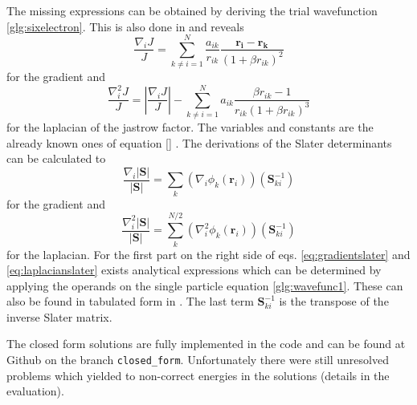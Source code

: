 The missing expressions can be obtained by deriving the trial wavefunction \ref{glg:sixelectron}. This is also done in \citet{hogberget2013} and reveals 
\begin{equation}\label{eq:jastrow-derivations}
    \frac{\nabla_i J}{J} = \sum_{k\neq i = 1}^{N}\frac{a_{ik}}{r_{ik}} \frac{\mathbf{r_i}-\mathbf{r_k}}{\left(1 + \beta r_{ik} \right)^2}
\end{equation}
for the gradient and 
\begin{equation}
    \frac{\nabla_i^2 J}{J} = \left| \frac{\nabla_i J}{J} \right| - \sum_{k\neq i = 1}^{N}a_{ik} \frac{\beta r_{ik} - 1}{r_{ik}\left(1 +\beta r_{ik} \right)^3} 
\end{equation}
for the laplacian of the jastrow factor. The variables and constants are the already known ones of equation \ref{} . The derivations of the Slater determinants can be calculated to
\begin{equation}\label{eq:gradientslater}
    \frac{\nabla_i |\mathbf{S}|}{|\mathbf{S}|} = \sum_k \left( \nabla_i \phi_k(\mathbf{r}_i)\right)(\mathbf{S}_{ki}^{-1})
\end{equation}
for the gradient and
\begin{equation}\label{eq:laplacianslater}
    \frac{\nabla_i^2 |\mathbf{S}|}{|\mathbf{S}|} = \sum_k^{N/2} \left( \nabla_i^2 \phi_k(\mathbf{r}_i)\right)(\mathbf{S}_{ki}^{-1})
\end{equation}
for the laplacian. For the first part on the right side of eqs. \ref{eq:gradientslater} and \ref{eq:laplacianslater} exists analytical expressions which can be determined by applying the operands on the single particle equation \ref{glg:wavefunc1}. These can also be found in tabulated form in \citet[app. D]{hogberget2013}. The last term $\mathbf{S}_{ki}^{-1}$ is the transpose of the inverse Slater matrix. 

The closed form solutions are fully implemented in the code and can be found at Github on the branch \texttt{closed\_form}. Unfortunately there were still unresolved problems which yielded to non-correct energies in the solutions (details in the evaluation). 
